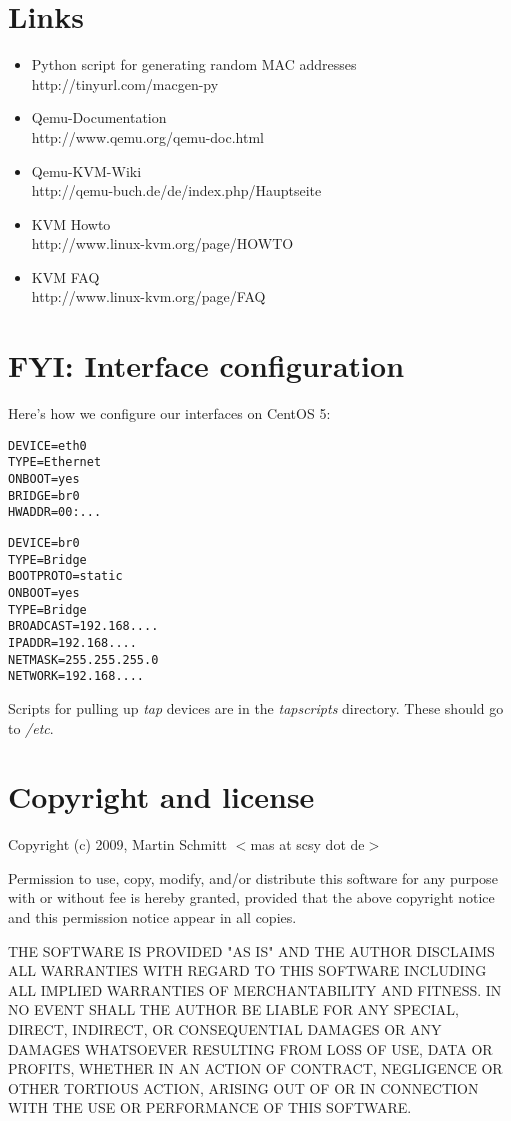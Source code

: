 \documentclass[11pt]{article}
\begin{document}
\begin{appendix}
\section{Links}

\begin{itemize}
\item Python script for generating random MAC addresses \\ http://tinyurl.com/macgen-py
\item Qemu-Documentation \\ http://www.qemu.org/qemu-doc.html
\item Qemu-KVM-Wiki \\ http://qemu-buch.de/de/index.php/Hauptseite
\item KVM Howto \\  http://www.linux-kvm.org/page/HOWTO
\item KVM FAQ \\  http://www.linux-kvm.org/page/FAQ
\end{itemize}

\section{FYI: Interface configuration}

Here's how we configure our interfaces on CentOS 5:

\begin{lstlisting}[caption=ifcfg-eth0 - The ethernet interface]
DEVICE=eth0
TYPE=Ethernet
ONBOOT=yes
BRIDGE=br0
HWADDR=00:...
\end{lstlisting}

\begin{lstlisting}[caption=ifcfg-br0 - The bridge]
DEVICE=br0
TYPE=Bridge
BOOTPROTO=static
ONBOOT=yes
TYPE=Bridge
BROADCAST=192.168....
IPADDR=192.168....
NETMASK=255.255.255.0
NETWORK=192.168....
\end{lstlisting}

Scripts for pulling up \emph{tap} devices are in the \emph{tapscripts} directory. 
These should go to \emph{/etc}.

\section{Copyright and license}

Copyright (c) 2009, Martin Schmitt $<$mas at scsy dot de$>$

Permission to use, copy, modify, and/or distribute this software for any
purpose with or without fee is hereby granted, provided that the above
copyright notice and this permission notice appear in all copies.

THE SOFTWARE IS PROVIDED "AS IS" AND THE AUTHOR DISCLAIMS ALL WARRANTIES
WITH REGARD TO THIS SOFTWARE INCLUDING ALL IMPLIED WARRANTIES OF
MERCHANTABILITY AND FITNESS. IN NO EVENT SHALL THE AUTHOR BE LIABLE FOR
ANY SPECIAL, DIRECT, INDIRECT, OR CONSEQUENTIAL DAMAGES OR ANY DAMAGES
WHATSOEVER RESULTING FROM LOSS OF USE, DATA OR PROFITS, WHETHER IN AN
ACTION OF CONTRACT, NEGLIGENCE OR OTHER TORTIOUS ACTION, ARISING OUT OF
OR IN CONNECTION WITH THE USE OR PERFORMANCE OF THIS SOFTWARE.
\end{appendix}
\end{document}
